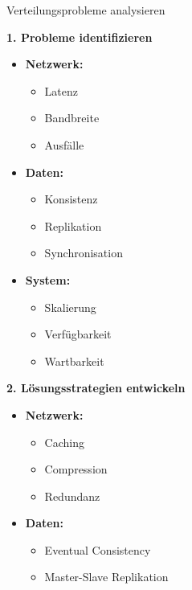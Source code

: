 \begin{KR}{Verteilungsprobleme analysieren}

    \begin{minipage}[t]{0.5\textwidth}
        \textbf{1. Probleme identifizieren}
        \begin{itemize}
            \item \textbf{Netzwerk:}
            \begin{itemize}
                \item Latenz
                \item Bandbreite
                \item Ausfälle
            \end{itemize}
            \item \textbf{Daten:}
            \begin{itemize}
                \item Konsistenz
                \item Replikation
                \item Synchronisation
            \end{itemize}
            \item \textbf{System:}
            \begin{itemize}
                \item Skalierung
                \item Verfügbarkeit
                \item Wartbarkeit
            \end{itemize}
        \end{itemize}
    \end{minipage}
    \begin{minipage}[t]{0.5\textwidth}
        \textbf{2. Lösungsstrategien entwickeln}
        \begin{itemize}
            \item \textbf{Netzwerk:}
            \begin{itemize}
                \item Caching
                \item Compression
                \item Redundanz
            \end{itemize}
            \item \textbf{Daten:}
            \begin{itemize}
                \item Eventual Consistency
                \item Master-Slave Replikation

\end{itemize}
\end{itemize}
\end{minipage}
\end{KR}
